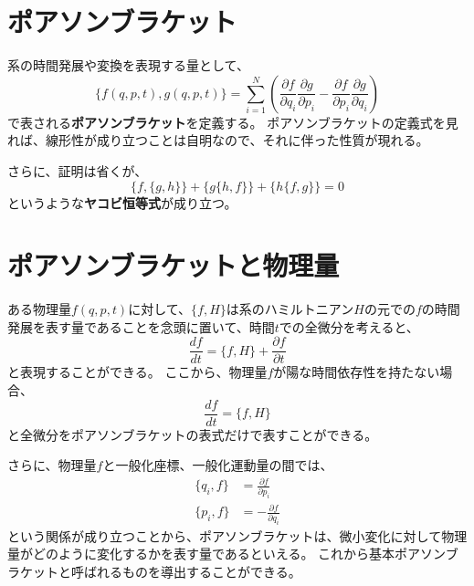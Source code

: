 \documentclass[a4paper]{jsreport}
\begin{document}
        \section{ポアソンブラケット}
            系の時間発展や変換を表現する量として、
            \begin{equation}
                \{f(q, p, t), g(q, p, t)\} = \sum_{i=1}^N \left(\frac{\partial f}{\partial q_i}\frac{\partial g}{\partial p_i} - \frac{\partial f}{\partial p_i}\frac{\partial g}{\partial q_i}\right)
            \end{equation}
            で表される\textbf{ポアソンブラケット}を定義する。
            ポアソンブラケットの定義式を見れば、線形性が成り立つことは自明なので、それに伴った性質が現れる。\par
            さらに、証明は省くが、
            \begin{equation}
                \{ f, \{ g, h \} \} + \{ g \{ h, f \} \} + \{ h \{ f, g \} \} = 0
            \end{equation}
            というような\textbf{ヤコビ恒等式}が成り立つ。

        \section{ポアソンブラケットと物理量}
            ある物理量$f(q, p ,t)$に対して、$\{ {f, H} \}$は系のハミルトニアン$H$の元での$f$の時間発展を表す量であることを念頭に置いて、時間$t$での全微分を考えると、
            \begin{equation}
                \frac{df}{dt} = \{f, H\} + \frac{\partial f}{\partial t}
            \end{equation}
            と表現することができる。
            ここから、物理量$f$が陽な時間依存性を持たない場合、
            \begin{equation}
                \frac{df}{dt} = \{f, H\}
            \end{equation}
            と全微分をポアソンブラケットの表式だけで表すことができる。\par
            さらに、物理量$f$と一般化座標、一般化運動量の間では、
            \begin{align}
                \{ q_i, f \} &= \frac{\partial f}{\partial p_i} \\
                \{ p_i, f \} &= - \frac{\partial f}{\partial q_i}
            \end{align}
            という関係が成り立つことから、ポアソンブラケットは、微小変化に対して物理量がどのように変化するかを表す量であるといえる。
            これから基本ポアソンブラケットと呼ばれるものを導出することができる。
\end{document}
